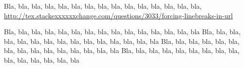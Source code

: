 \documentclass[12pt]{article}
\begin{document}
Bla, bla, bla, bla, bla, bla, bla, bla, bla, bla, bla, bla, bla, bla, bla,
\url{http://tex.stackexxxxxxchange.com/questions/3033/forcing-linebreaks-in-url}

Bla, bla, bla, bla, bla, bla, bla, bla, bla, bla, bla, bla, bla, bla, bla
Bla, bla, bla, bla, bla, bla, bla, bla, bla, bla, bla, bla, bla, bla, bla
Bla, bla, bla, bla, bla, bla, bla, bla, bla, bla, bla, bla, bla, bla, bla
Bla, bla, bla, bla, bla, bla, bla, bla, bla, bla, bla, bla, bla, bla, bla
\end{document}
